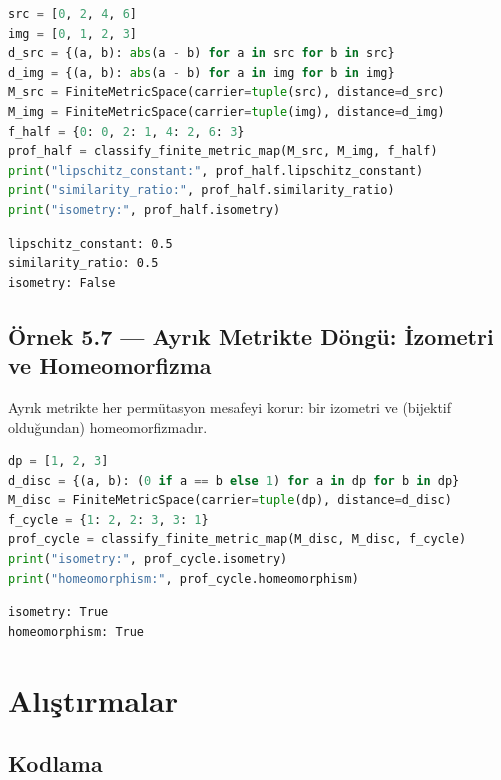 \begin{lstlisting}[language=Python]
src = [0, 2, 4, 6]
img = [0, 1, 2, 3]
d_src = {(a, b): abs(a - b) for a in src for b in src}
d_img = {(a, b): abs(a - b) for a in img for b in img}
M_src = FiniteMetricSpace(carrier=tuple(src), distance=d_src)
M_img = FiniteMetricSpace(carrier=tuple(img), distance=d_img)
f_half = {0: 0, 2: 1, 4: 2, 6: 3}
prof_half = classify_finite_metric_map(M_src, M_img, f_half)
print("lipschitz_constant:", prof_half.lipschitz_constant)
print("similarity_ratio:", prof_half.similarity_ratio)
print("isometry:", prof_half.isometry)
\end{lstlisting}

\begin{verbatim}
lipschitz_constant: 0.5
similarity_ratio: 0.5
isometry: False
\end{verbatim}

\subsection*{Örnek 5.7 — Ayrık Metrikte Döngü: İzometri ve Homeomorfizma}

Ayrık metrikte her permütasyon mesafeyi korur: bir izometri ve (bijektif
olduğundan) homeomorfizmadır.

\begin{lstlisting}[language=Python]
dp = [1, 2, 3]
d_disc = {(a, b): (0 if a == b else 1) for a in dp for b in dp}
M_disc = FiniteMetricSpace(carrier=tuple(dp), distance=d_disc)
f_cycle = {1: 2, 2: 3, 3: 1}
prof_cycle = classify_finite_metric_map(M_disc, M_disc, f_cycle)
print("isometry:", prof_cycle.isometry)
print("homeomorphism:", prof_cycle.homeomorphism)
\end{lstlisting}

\begin{verbatim}
isometry: True
homeomorphism: True
\end{verbatim}

\section{Alıştırmalar}

\subsection*{Kodlama}

